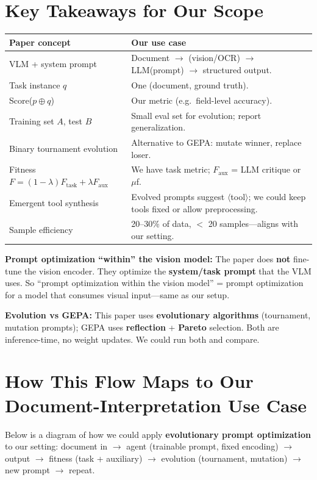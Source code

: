 \documentclass[11pt,a4paper]{article}
\begin{document}
\section{Key Takeaways for Our Scope}

\begin{center}
\begin{tabular}{@{}ll@{}}
\toprule
\textbf{Paper concept} & \textbf{Our use case} \\
\midrule
VLM + system prompt & Document $\to$ (vision/OCR) $\to$ LLM(prompt) $\to$ structured output. \\
Task instance $q$ & One (document, ground truth). \\
Score($p \oplus q$) & Our metric (e.g.\ field-level accuracy). \\
Training set $A$, test $B$ & Small eval set for evolution; report generalization. \\
Binary tournament evolution & Alternative to GEPA: mutate winner, replace loser. \\
Fitness $F = (1-\lambda)F_{\mathrm{task}} + \lambda F_{\mathrm{aux}}$ & We have task metric; $F_{\mathrm{aux}}$ = LLM critique or $\mu$f. \\
Emergent tool synthesis & Evolved prompts suggest $\langle$tool$\rangle$; we could keep tools fixed or allow preprocessing. \\
Sample efficiency & 20--30\% of data, $<$ 20 samples---aligns with our setting. \\
\bottomrule
\end{tabular}
\end{center}

\textbf{Prompt optimization ``within'' the vision model:} The paper does \textbf{not} fine-tune the vision encoder. They optimize the \textbf{system/task prompt} that the VLM uses. So ``prompt optimization within the vision model'' = prompt optimization for a model that consumes visual input---same as our setup.

\textbf{Evolution vs GEPA:} This paper uses \textbf{evolutionary algorithms} (tournament, mutation prompts); GEPA uses \textbf{reflection} + \textbf{Pareto} selection. Both are inference-time, no weight updates. We could run both and compare.

\section{How This Flow Maps to Our Document-Interpretation Use Case}

Below is a diagram of how we could apply \textbf{evolutionary prompt optimization} to our setting: document in $\to$ agent (trainable prompt, fixed encoding) $\to$ output $\to$ fitness (task + auxiliary) $\to$ evolution (tournament, mutation) $\to$ new prompt $\to$ repeat.
\end{document}
